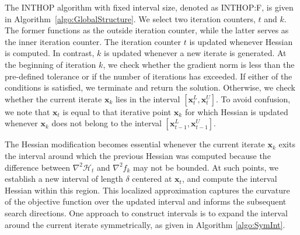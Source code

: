 \documentclass{elsarticle}
\numberwithin{equation}{section}
\begin{document}
The INTHOP algorithm with fixed interval size, denoted as INTHOP:F, is given in Algorithm~\ref{algo:GlobalStructure}. We select two iteration counters, $t$ and $k$. The former functions as the outside iteration counter, while the latter serves as the inner iteration counter.  The iteration counter $t$ is updated whenever Hessian is computed. In contrast, $k$ is updated whenever a new iterate is generated. At the beginning of iteration $k$, we check whether the gradient norm is less than the pre-defined tolerance or if the number of iterations has exceeded. If either of the conditions is satisfied, we terminate and return the solution. Otherwise, we check whether the current iterate $\mathbf{x}_k$ lies in the interval $[\mathbf{x}_t^L, \mathbf{x}_t^U]$. To avoid confusion, we note that $\mathbf{x}_t$ is equal to that  iterative point $\mathbf{x}_{k}$  for which Hessian is updated whenever $\mathbf{x}_{k}$ does not belong to the interval $[\mathbf{x}_{t-1}^L, \mathbf{x}_{t-1}^U]$.

The Hessian modification becomes essential whenever the current iterate \(\mathbf{x}_k\) exits the interval around which the previous Hessian was computed because the difference between $\nabla^2 \mathcal{H}_t$ and $\nabla^2 {f}_k$ may not be bounded. At such points, we establish a new interval of length \(\delta\) centered at \(\mathbf{x}_t\), and compute the interval Hessian within this region. This localized approximation captures the curvature of the objective function over the updated interval and informs the subsequent search directions. One approach to construct intervals is to expand the interval around the current iterate symmetrically, as given in Algorithm \ref{algo:SymInt}. 
\end{document}
